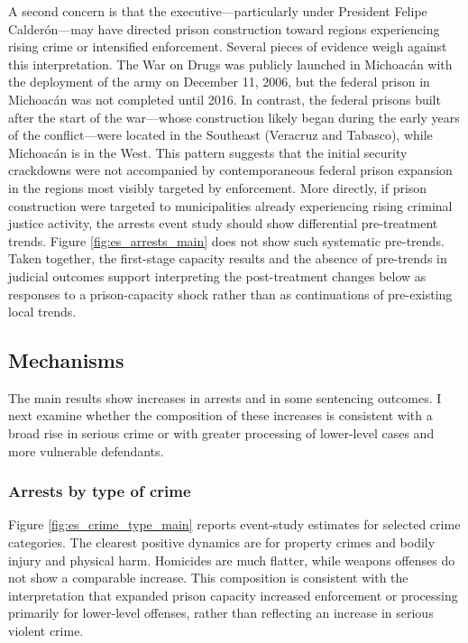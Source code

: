 A second concern is that the executive—particularly under President Felipe Calderón—may have directed prison construction toward regions experiencing rising crime or intensified enforcement. Several pieces of evidence weigh against this interpretation. The War on Drugs was publicly launched in Michoacán with the deployment of the army on December 11, 2006, but the federal prison in Michoacán was not completed until 2016. In contrast, the federal prisons built after the start of the war—whose construction likely began during the early years of the conflict—were located in the Southeast (Veracruz and Tabasco), while Michoacán is in the West. This pattern suggests that the initial security crackdowns were not accompanied by contemporaneous federal prison expansion in the regions most visibly targeted by enforcement. More directly, if prison construction were targeted to municipalities already experiencing rising criminal justice activity, the arrests event study should show differential pre-treatment trends. Figure \ref{fig:es_arrests_main} does not show such systematic pre-trends. Taken together, the first-stage capacity results and the absence of pre-trends in judicial outcomes support interpreting the post-treatment changes below as responses to a prison-capacity shock rather than as continuations of pre-existing local trends.

\subsection*{Mechanisms}

The main results show increases in arrests and in some sentencing outcomes. I next examine whether the composition of these increases is consistent with a broad rise in serious crime or with greater processing of lower-level cases and more vulnerable defendants.

\subsubsection*{Arrests by type of crime}

Figure \ref{fig:es_crime_type_main} reports event-study estimates for selected crime categories. The clearest positive dynamics are for property crimes and bodily injury and physical harm. Homicides are much flatter, while weapons offenses do not show a comparable increase. This composition is consistent with the interpretation that expanded prison capacity increased enforcement or processing primarily for lower-level offenses, rather than reflecting an increase in serious violent crime.

